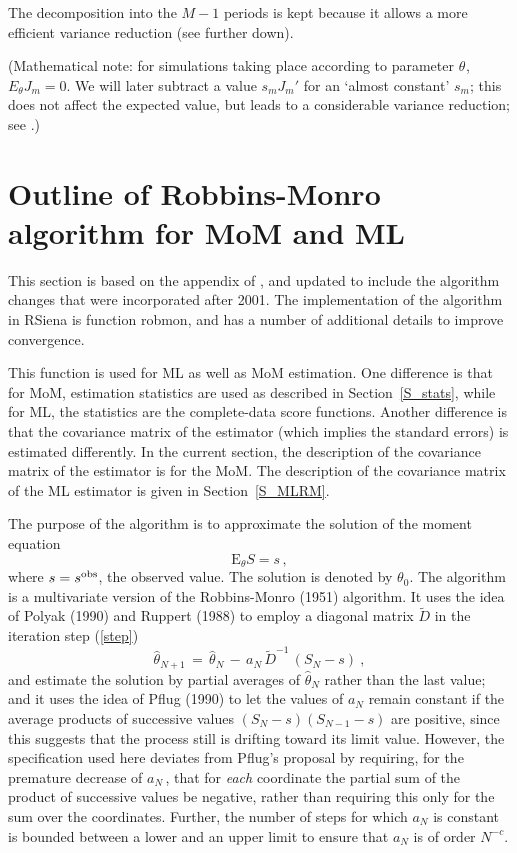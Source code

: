 \documentclass[a4paper,12pt,fleqn]{article}
\newcommand{\E}{\mbox{E}}
\renewcommand{\th}[1]{$\theta_{#1}$}
\newcommand{\nm}[1]{\textsf{\small #1}}
\begin{document}
The decomposition into the $M-1$ periods is kept because it allows a more efficient
variance reduction (see further down).

(Mathematical note: for simulations taking place according to parameter \th{},
$E_{\theta} J_m = 0$.
We will later subtract a value $s_m J_m '$
for an `almost constant' $s_m$; this does not affect the expected value,
but leads to a considerable variance reduction;
see \citet{SchweinbergerSnijders07a}.)

\section{Outline of Robbins-Monro algorithm for MoM and ML}
\label{S_RobMon}

This section is based on the appendix of
\citet{Snijders01}, and updated
to include the algorithm changes that were incorporated after 2001.
The implementation of the algorithm in RSiena is function
\nm{robmon}, and has a number of additional
details to improve convergence.

This function is used for ML as well as MoM estimation.
One difference is that for MoM, estimation statistics are used
as described in Section~\ref{S_stats}, while for ML,
the statistics are the complete-data score functions.
Another difference is that the covariance matrix of the estimator
(which implies the standard errors) is estimated differently.
In the current section, the description of the covariance
matrix of the estimator is for the MoM.
The description of the covariance matrix of the ML estimator is
given in Section~\ref{S_MLRM}.

The purpose of the algorithm is to approximate the solution of the
moment equation
\begin{equation}
  \E_\theta S = s\, ,   \label{mom_eq0}
\end{equation}
where $s = s^{\rm{obs}}$, the observed value.
The solution is denoted by $\theta_0$.
The algorithm is a multivariate version of the Robbins-Monro (1951) algorithm.
It uses the idea of Polyak (1990) and Ruppert (1988)
to employ a diagonal matrix $\tilde{D}$ in the iteration step (\ref{step})
\begin{equation}
 \hat{\theta}_{N+1} \,=\, \hat{\theta}_N \, - \, a_N\, {\tilde{D}}^{-1} \, (S_N - s)~,   \label{step}
\end{equation}
 and estimate
the solution by partial averages of $\hat{\theta}_N$ rather than the
last value; and it uses the idea of Pflug (1990) to let the values of $a_N$ remain
constant if the average products of successive values $(S_N - s)(S_{N-1}-s)$
are positive, since this suggests that the process still is drifting toward its
limit value.
However, the specification used here deviates from Pflug's proposal by requiring,
for the premature decrease of $a_N\,$,
that for {\em each} coordinate the partial sum of the product of successive values
be negative, rather than requiring this only for the sum over the coordinates.
Further, the number of steps for which $a_N$ is constant is bounded between a lower
and an upper limit to ensure that $a_N$ is of order $N^{-c}$.
\end{document}
